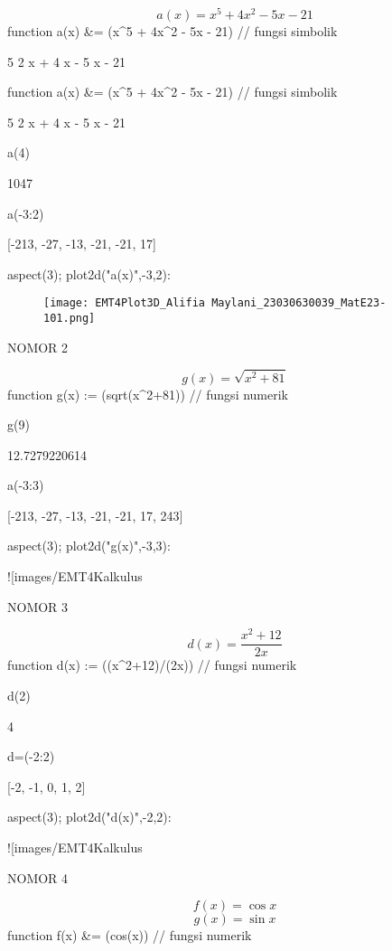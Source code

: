 \documentclass{article}
\begin{document}
$$a(x) = x^5 + 4x^2 - 5x - 21$$\>function a(x) &= (x^5 + 4\*x^2 - 5\*x - 21) // fungsi simbolik


    
                              5      2
                             x  + 4 x  - 5 x - 21
    

\>function a(x) &= (x^5 + 4\*x^2 - 5\*x - 21) // fungsi simbolik


    
                              5      2
                             x  + 4 x  - 5 x - 21
    

\>a(4)


    1047

\>a(-3:2)


    [-213,  -27,  -13,  -21,  -21,  17]

\>aspect(3); plot2d("a(x)",-3,2):


\begin{figure}
    \centering
    \texttt{[image: EMT4Plot3D\_Alifia Maylani\_23030630039\_MatE23-101.png]}
    \caption{}
    \label{fig:enter-label}
\end{figure}

                            NOMOR 2  

$$g(x)=\sqrt{x^2+81}$$\>function g(x) := (sqrt(x^2+81)) // fungsi numerik

\>g(9)


    12.7279220614

\>a(-3:3)


    [-213,  -27,  -13,  -21,  -21,  17,  243]

\>aspect(3); plot2d("g(x)",-3,3):


![images/EMT4Kalkulus%

                                NOMOR 3  

$$d(x)= \frac{x^2 + 12}{2x}$$\>function d(x) := ((x^2+12)/(2\*x)) // fungsi numerik

\>d(2)


    4

\>d=(-2:2)


    [-2,  -1,  0,  1,  2]

\>aspect(3); plot2d("d(x)",-2,2):


![images/EMT4Kalkulus%

                             NOMOR 4  

$$f(x)= \cos{x}$$$$g(x)= \sin{x}$$\>function f(x) &= (cos(x)) // fungsi numerik
\end{document}
